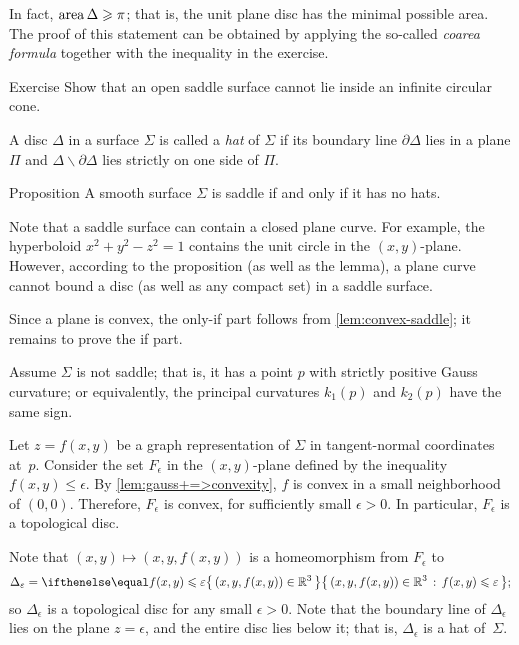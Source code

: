 In fact, $\mathop{\rm area}\nolimits \Delta\geqslant \pi$;
that is, the unit plane disc has the minimal possible area.
The proof of this statement can be obtained by applying the so-called \emph{coarea formula} together with the inequality in the exercise. 

\begin{thm}{Exercise}\label{ex:circular-cone-saddle}
Show that an open saddle surface
cannot lie inside an infinite circular cone. 
\end{thm}

A disc $\Delta$ in a surface $\Sigma$ is called a \emph{hat} of $\Sigma$
if its boundary line $\partial\Delta$ lies in a plane $\Pi$ and $\Delta \backslash \partial \Delta$ lies strictly on one side of $\Pi$.

\begin{thm}{Proposition}\label{prop:hat}
A smooth surface $\Sigma$ is saddle if and only if it has no hats.
\end{thm}

Note that a saddle surface can contain a closed plane curve.
For example, the hyperboloid $x^2+y^2-z^2=1$ contains the unit circle in the $(x,y)$-plane.
However, according to the proposition (as well as the lemma), a plane curve cannot bound a disc (as well as any compact set) in a saddle surface.

Since a plane is convex, the only-if part follows from \ref{lem:convex-saddle};
it remains to prove the if part.

Assume $\Sigma$ is not saddle; that is, it has a point $p$ with strictly positive Gauss curvature;
or equivalently, the principal curvatures $k_1(p)$ and $k_2(p)$ have the same sign.


Let $z=f(x,y)$ be a graph representation of $\Sigma$ in tangent-normal coordinates at~$p$.
Consider the set $F_\epsilon$ in the $(x,y)$-plane defined by the inequality $f(x,y)\le \epsilon$.
By \ref{lem:gauss+=>convexity}, $f$ is convex in a small neighborhood of $(0,0)$.
Therefore, $F_\epsilon$ is convex, for sufficiently small $\epsilon>0$.
In particular, $F_\epsilon$ is a topological disc.

Note that $(x,y)\mapsto (x,y,f(x,y))$ is a homeomorphism from $F_\epsilon$
to
\[\Delta_\epsilon=\set{(x,y,f(x,y))\in \mathbb{R}^3}{f(x,y)\le \epsilon};\]
so $\Delta_\epsilon$ is a topological disc for any small $\epsilon>0$.
Note that the boundary line of $\Delta_\epsilon$ lies on the plane $z=\epsilon$, and the entire disc lies below it;
that is, $\Delta_\epsilon$ is a hat of~$\Sigma$.
\qeds

